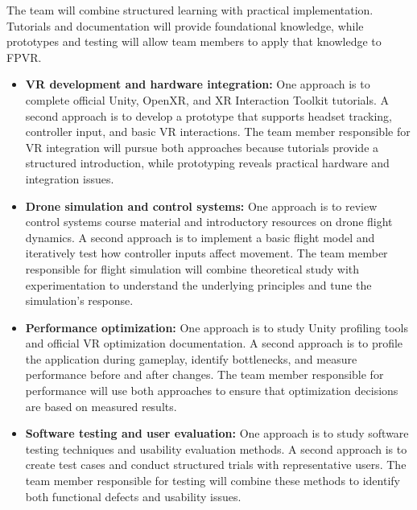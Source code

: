 \documentclass{article}
\begin{document}
\begin{enumerate}
    The team will combine structured learning with practical
    implementation. Tutorials and documentation will provide
    foundational knowledge, while prototypes and testing will
    allow team members to apply that knowledge to FPVR.

    \begin{itemize}
        \item \textbf{VR development and hardware integration:}
        One approach is to complete official Unity, OpenXR, and
        XR Interaction Toolkit tutorials. A second approach is
        to develop a prototype that supports headset tracking,
        controller input, and basic VR interactions. The team
        member responsible for VR integration will pursue both
        approaches because tutorials provide a structured
        introduction, while prototyping reveals practical
        hardware and integration issues.

        \item \textbf{Drone simulation and control systems:}
        One approach is to review control systems course material
        and introductory resources on drone flight dynamics.
        A second approach is to implement a basic flight model
        and iteratively test how controller inputs affect movement.
        The team member responsible for flight simulation will
        combine theoretical study with experimentation to
        understand the underlying principles and tune the
        simulation's response.

        \item \textbf{Performance optimization:}
        One approach is to study Unity profiling tools and
        official VR optimization documentation. A second
        approach is to profile the application during gameplay,
        identify bottlenecks, and measure performance before
        and after changes. The team member responsible for
        performance will use both approaches to ensure that
        optimization decisions are based on measured results.

        \item \textbf{Software testing and user evaluation:}
        One approach is to study software testing techniques
        and usability evaluation methods. A second approach
        is to create test cases and conduct structured trials
        with representative users. The team member responsible
        for testing will combine these methods to identify
        both functional defects and usability issues.


\end{itemize}
\end{enumerate}
\end{document}
